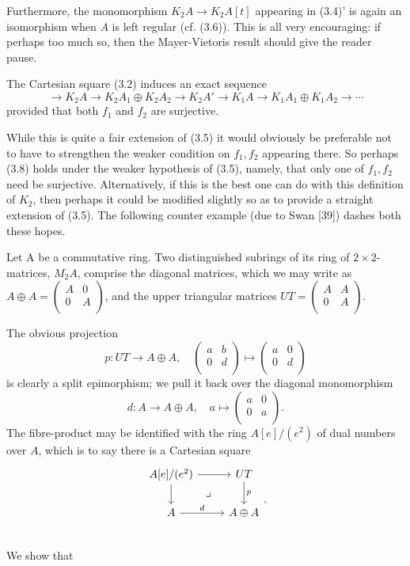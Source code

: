 Furthermore, the monomorphism $K_2A \longrightarrow K_2A[t]$ appearing in (3.4)' is again an isomorphism when $A$ is left regular (cf. (3.6)). This is all very encouraging: if perhaps too much so, then the Mayer-Vietoris result should give the reader pause.
\begin{theorem}
The Cartesian square (3.2) induces an exact sequence 
\[ \longrightarrow K_2 A \longrightarrow K_2 A_1\oplus K_2A_2 \longrightarrow K_2 A' \longrightarrow K_{1}A\longrightarrow K_1 A_1\oplus K_1A_2 \longrightarrow \cdots\]
provided that both $f_1$ and $f_2$ are surjective.
\end{theorem}
While this is quite a fair extension of (3.5) it would obviously be preferable not to have to strengthen the weaker condition on $f_1, f_2$ appearing there. So perhaps (3.8) holds under the weaker hypothesis of (3.5), namely, that only one of $f_1, f_2$ need be surjective. Alternatively, if this is the best one can do with this definition of $K_2$, then perhaps it could be modified slightly so as to provide a straight extension of (3.5). The following counter example (due to Swan [39]) dashes both these hopes.
\begin{ex}
  Let A be a commutative ring. Two distinguished subrings of its ring of
$2\times 2$-matrices, $M_2 A$, comprise the diagonal matrices, which we may write as $A\oplus A= \begin{pmatrix}
A  & 0\\
0& A\\
\end{pmatrix}$, and the upper triangular matrices $UT =\begin{pmatrix}
A  & A\\
0& A\\
\end{pmatrix}$.
\end{ex}
The obvious projection
\[p\colon  UT\longrightarrow A\oplus A,\quad \begin{pmatrix}
a  & b\\
0& d\\
\end{pmatrix} \mapsto \begin{pmatrix}
a  & 0\\
0& d\\
\end{pmatrix}\]
is clearly a split epimorphism; we pull it back over the diagonal monomorphism 
\[d\colon  A\longrightarrow A\oplus A,\quad a \mapsto \begin{pmatrix}
a  & 0\\
0& a\\
\end{pmatrix}.\]
The fibre-product may be identified with the ring $A[e]/(e^2)$ of dual numbers over $A$, which is to say there is a Cartesian square 
\[\begin{tikzcd}
A[e]/(e^2) \arrow{r} \arrow{d} \arrow[dr, phantom, "\lrcorner"]& UT \arrow{d}{p}\\
A \arrow{r}{d} & A\oplus A \\
\end{tikzcd}.\]
We show that


